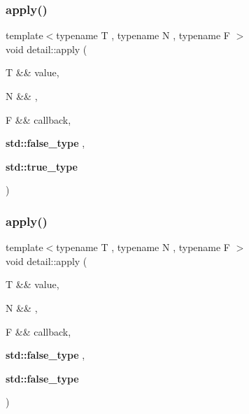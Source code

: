 \subsubsection{\texorpdfstring{apply()}{apply()}\hspace{0.1cm}{\footnotesize\ttfamily [3/4]}}
{\footnotesize\ttfamily template$<$typename T , typename N , typename F $>$ \\
void detail\+::apply (\begin{DoxyParamCaption}\item[{T \&\&}]{value,  }\item[{N \&\&}]{,  }\item[{F \&\&}]{callback,  }\item[{\textbf{ std\+::false\+\_\+type}}]{,  }\item[{\textbf{ std\+::true\+\_\+type}}]{ }\end{DoxyParamCaption})}

\mbox{\label{namespacedetail_a2de0e5f4ba1129708f2efe0d017826d7}} 
\subsubsection{\texorpdfstring{apply()}{apply()}\hspace{0.1cm}{\footnotesize\ttfamily [4/4]}}
{\footnotesize\ttfamily template$<$typename T , typename N , typename F $>$ \\
void detail\+::apply (\begin{DoxyParamCaption}\item[{T \&\&}]{value,  }\item[{N \&\&}]{,  }\item[{F \&\&}]{callback,  }\item[{\textbf{ std\+::false\+\_\+type}}]{,  }\item[{\textbf{ std\+::false\+\_\+type}}]{ }\end{DoxyParamCaption})}

